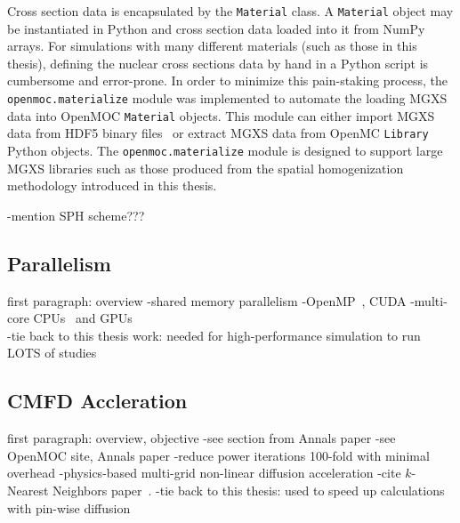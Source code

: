 Cross section data is encapsulated by the \texttt{Material} class. A \texttt{Material} object may be instantiated in Python and cross section data loaded into it from NumPy arrays. For simulations with many different materials (such as those in this thesis), defining the nuclear cross sections data by hand in a Python script is cumbersome and error-prone. In order to minimize this pain-staking process, the \texttt{openmoc.materialize} module was implemented to automate the loading \ac{MGXS} data into OpenMOC \texttt{Material} objects. This module can either import \ac{MGXS} data from HDF5 binary files~\cite{koranne2011hdf5} or extract \ac{MGXS} data from OpenMC \texttt{Library} Python objects. The \texttt{openmoc.materialize} module is designed to support large \ac{MGXS} libraries such as those produced from the spatial homogenization methodology introduced in this thesis.

-mention SPH scheme??? \\

\subsection{Parallelism}
\label{subsubsec:chap4-openmoc-parallel}

first paragraph: overview
-shared memory parallelism
-OpenMP~\cite{openmp2013}, CUDA
-multi-core \ac{CPUs}~\cite{boyd2016parallel} and GPUs~\cite{boyd2013massively} \\
-tie back to this thesis work: needed for high-performance simulation to run LOTS of studies

\subsection{CMFD Accleration}
\label{subsubsec:chap4-openmoc-cmfd}

first paragraph: overview, objective
-see section from Annals paper
-see OpenMOC site, Annals paper
-reduce power iterations 100-fold with minimal overhead
-physics-based multi-grid non-linear diffusion acceleration
-cite $k$-Nearest Neighbors paper~\cite{shaner2015cmfd}.
-tie back to this thesis: used to speed up calculations with pin-wise diffusion 

